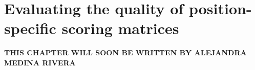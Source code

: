 
\chapter{Evaluating the quality of position-specific scoring matrices}

\textbf{THIS CHAPTER WILL SOON BE WRITTEN BY ALEJANDRA MEDINA RIVERA}
